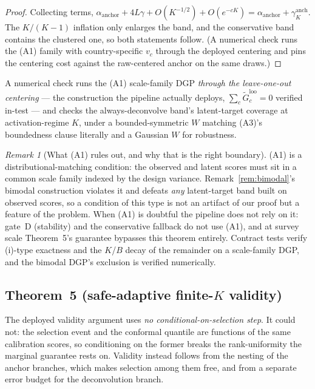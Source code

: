 \documentclass[12pt]{article}
\theoremstyle{definition}
\theoremstyle{remark}
\newtheorem{remark}{Remark}
\begin{document}
\begin{proof}
Collecting terms, $\alpha_{\text{anchor}}+4L\gamma+O(K^{-1/2})+O(e^{-cK})
=\alpha_{\text{anchor}}+\gamma^{\text{anch}}_K$. The $K/(K{-}1)$ inflation
only enlarges the band, and the conservative band contains the clustered one,
so both statements follow. (A numerical check runs the (A1) family with
country-specific $v_c$ through the deployed centering and pins the centering
cost against the raw-centered anchor on the same draws.)
\end{proof}

A numerical check runs the (A1) scale-family DGP
\emph{through the leave-one-out centering} --- the construction the pipeline
actually deploys, $\sum_c\widetilde G^{\text{loo}}_c=0$ verified in-test ---
and checks the always-deconvolve band's latent-target coverage at
activation-regime $K$, under a bounded-symmetric $W$ matching (A3)'s
boundedness clause literally and a Gaussian $W$ for robustness.

\begin{remark}[What (A1) rules out, and why that is the right boundary]
(A1) is a distributional-matching condition: the observed and latent scores must sit
in a common scale family indexed by the design variance. Remark~\ref{rem:bimodal}'s
bimodal construction violates it and defeats \emph{any} latent-target band built on
observed scores, so a condition of this type is not an artifact of our proof but a
feature of the problem. When (A1) is doubtful the pipeline does not rely on it:
gate~D (stability) and the conservative fallback do not use (A1), and at survey scale
Theorem~5's guarantee bypasses this theorem entirely. Contract tests verify
(i)-type exactness and the
$K$/$B$ decay of the remainder on a scale-family DGP, and the bimodal DGP's exclusion
is verified numerically.
\end{remark}

\subsection{Theorem~5 (safe-adaptive finite-$K$ validity)}

The deployed validity argument uses \emph{no conditional-on-selection step}.
It could not: the selection event and the conformal quantile are functions of
the same calibration scores, so conditioning on the former breaks the
rank-uniformity the marginal guarantee rests on. Validity instead follows from
the nesting of the anchor branches, which makes selection among them free, and
from a separate error budget for the deconvolution branch.
\end{document}
